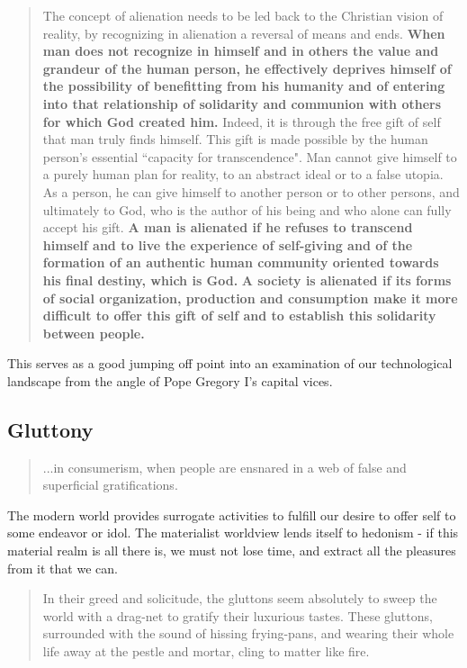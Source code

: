 \documentclass[letterpaper]{article}
\begin{document}
\begin{quote}
  The concept of alienation needs to be led back to the Christian vision of reality, by recognizing in alienation a reversal of means and ends. \textbf{When man does not recognize in himself and in others the value and grandeur of the human person, he effectively deprives himself of the possibility of benefitting from his humanity and of entering into that relationship of solidarity and communion with others for which God created him.} Indeed, it is through the free gift of self that man truly finds himself. This gift is made possible by the human person's essential ``capacity for transcendence". Man cannot give himself to a purely human plan for reality, to an abstract ideal or to a false utopia. As a person, he can give himself to another person or to other persons, and ultimately to God, who is the author of his being and who alone can fully accept his gift. \textbf{A man is alienated if he refuses to transcend himself and to live the experience of self-giving and of the formation of an authentic human community oriented towards his final destiny, which is God.} \textbf{A society is alienated if its forms of social organization, production and consumption make it more difficult to offer this gift of self and to establish this solidarity between people.}
\end{quote}

This serves as a good jumping off point into an examination of our technological landscape from the angle of Pope Gregory I's capital vices.

\subsection{Gluttony}

\begin{quote}
  ...in consumerism, when people are ensnared in a web of false and superficial gratifications.
\end{quote}

The modern world provides surrogate activities to fulfill our desire to offer self to some endeavor or idol. The materialist worldview lends itself to hedonism - if this material realm is all there is, we must not lose time, and extract all the pleasures from it that we can. 

\begin{quote}
  In their greed and solicitude, the gluttons seem absolutely to sweep the world with a drag-net to gratify their luxurious tastes. These gluttons, surrounded with the sound of hissing frying-pans, and wearing their whole life away at the pestle and mortar, cling to matter like fire. 
\end{quote}
\end{document}
